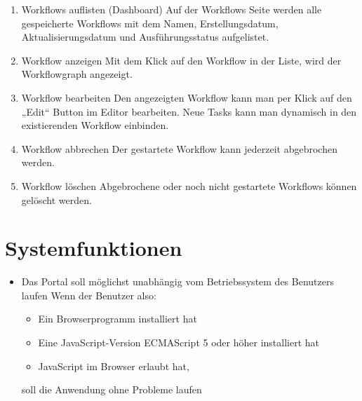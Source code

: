         \begin{enumerate}[font={\bfseries}, label={FA\arabic*}0, wide=0pt, labelindent=1em, leftmargin=*, resume]
            
            \item  \label{workflowAuflisten:1} Workflows auflisten (Dashboard)\newline
            Auf der Workflows Seite werden alle gespeicherte Workflows mit dem Namen, Erstellungsdatum, Aktualisierungsdatum und Ausführungsstatus aufgelistet.
            
            \item  \label{workflowWiederherstellen:1} Workflow anzeigen \newline
            Mit dem Klick auf den Workflow in der Liste, wird der Workflowgraph angezeigt.
            
            \item  \label{workflowBearbeiten:1} Workflow bearbeiten \newline
            Den angezeigten Workflow kann man per Klick auf den „Edit“ Button im Editor bearbeiten. Neue Tasks kann man dynamisch in den existierenden Workflow einbinden.
            
            \item \label{workflowAbbrechen:1} Workflow abbrechen \newline
            Der gestartete Workflow kann jederzeit abgebrochen werden.
            
            \item  \label{workflowLoeschen:1} Workflow löschen \newline
            Abgebrochene oder noch nicht gestartete Workflows können gelöscht werden.
            
        \end{enumerate}
        
    \section{Systemfunktionen}
        \begin{itemize}
            \item Das Portal soll möglichst unabhängig vom Betriebssystem des Benutzers laufen\newline
                Wenn der Benutzer also:
                \begin{itemize}
                    \item Ein Browserprogramm installiert hat
                    \item Eine JavaScript-Version ECMAScript 5 oder höher installiert hat
                    \item JavaScript im Browser erlaubt hat,
                \end{itemize}
                soll die Anwendung ohne Probleme laufen
        \end{itemize}
        
        
